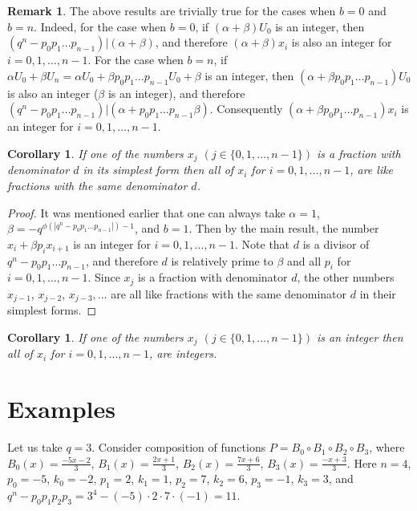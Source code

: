 \documentclass[12pt, twoside, leqno]{article}
\newtheorem{corollary}[theorem]{Corollary}
\theoremstyle{definition}
\newtheorem{remark}[theorem]{Remark}
\numberwithin{equation}{section}
\begin{document}
\begin{remark} The above results are trivially true for the cases when $b=0$ and $b=n$. Indeed, for the case when $b=0$, if $(\alpha +\beta)U_0$ is an integer, then $(q^n-p_0p_1\ldots p_{n-1})|(\alpha +\beta)$, and therefore $(\alpha +\beta)x_i$ is also an integer for $i=0,1,\ldots, n-1$. For the case when $b=n$, if $\alpha U_0 +\beta U_n=\alpha U_0 +\beta p_0p_1\ldots p_{n-1}U_0+\beta$ is an integer, then $(\alpha  +\beta p_0p_1\ldots p_{n-1})U_0$ is also an integer ($\beta$ is an integer), and therefore $(q^n-p_0p_1\ldots p_{n-1})|(\alpha +p_0p_1\ldots p_{n-1}\beta)$. Consequently $(\alpha +\beta p_0p_1\ldots p_{n-1})x_i$ is an integer for $i=0,1,\ldots, n-1$.
\end{remark}

\begin{corollary}{
If one of the numbers $x_j$ $(j\in \{0, 1,\ldots , n-1\})$ is a fraction with denominator $d$ in its simplest form then all of $x_i$ for $i=0, 1,\ldots , n-1$, are like fractions with the same denominator $d$.}
\end{corollary}
\begin{proof} It was mentioned earlier that one can always take $\alpha =1$, $\beta =-q^{\phi (|q^n-p_0p_1\ldots p_{n-1}|)-1}$, and $b=1$. Then by the main result, the number $x_i+\beta p_i x_{i+1}$ is an integer for $i=0, 1,\ldots , n-1$. Note that $d$ is a divisor of $q^n-p_0p_1\ldots p_{n-1}$, and therefore $d$ is relatively prime to $\beta$ and all $p_i$ for $i=0, 1,\ldots , n-1$. Since $x_j$ is a fraction with denominator $d$, the other numbers $x_{j-1}$, $x_{j-2}$, $x_{j-3},...$ are all like fractions with the same denominator $d$ in their simplest forms.
\end{proof}

\begin{corollary}{
If one of the numbers $x_j$ $(j\in \{0, 1,\ldots , n-1\})$ is an integer then all of $x_i$ for $i=0, 1,\ldots , n-1$, are integers.}
\end{corollary}
\section{Examples}
Let us take $q=3$. Consider composition of functions $P=B_0 \circ B_1 \circ B_2\circ B_3$, where $B_0 (x)=\frac{-5x-2}{3}$, $B_1 (x)=\frac{2x+1}{3}$, $B_2 (x)=\frac{7x+6}{3}$, $B_3 (x)=\frac{-x+3}{3}$. Here $n=4$, $p_0=-5$, $k_0=-2$, $p_1=2$, $k_1=1$, $p_2=7$, $k_2=6$, $p_3=-1$, $k_3=3$, and $q^n-p_0 p_1 p_2 p_3=3^4-(-5)\cdot 2\cdot 7\cdot (-1)=11$.
\end{document}

